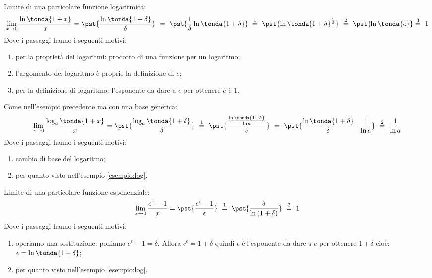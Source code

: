 \begin{esempio}
\label{esempio:log}
Limite di una particolare funzione logaritmica:
\[
 \lim_{x \rightarrow 0} \dfrac{\ln\tonda{1+x}}{x} =
 \pst{\dfrac{\ln\tonda{1+\delta}}{\delta}}~ = ~  
 \pst{\frac{1}{\delta}\ln\tonda{1+\delta}} ~\stackrel{1}{=} ~
 \pst{\ln\tonda{1+\delta}^\frac{1}{\delta}}
~ \stackrel{2}{=} ~
\pst{\ln\tonda{e}} \stackrel{3}{=} ~ 1
\]
Dove i passaggi hanno i seguenti motivi:
\begin{enumerate} [nosep]
 \item per la proprietà dei logaritmi: prodotto di una funzione per 
 un logaritmo;
 \item l'argomento del logaritmo è proprio la definizione di \(e\);
 \item per la definizione di logaritmo: l'esponente da dare a \(e\) per 
ottenere \(e\) è \(1\).
\end{enumerate}
\end{esempio}

\begin{esempio}
Come nell'esempio precedente ma con una base generica:
\[
 \lim_{x \rightarrow 0} \dfrac{\log_a\tonda{1+x}}{x} =
 \pst{\dfrac{\log_a\tonda{1+\delta}}{\delta}}~\stackrel{1}{=} ~  
 \pst{\dfrac{\frac{\ln\tonda{1+\delta}}{\ln a}}{\delta}}~= ~
 \pst{\dfrac{\ln\tonda{1+\delta}}{\delta}\cdot \dfrac{1}{\ln a}}
 ~ \stackrel{2}{=} ~
 \dfrac{1}{\ln a}
\]
Dove i passaggi hanno i seguenti motivi:
\begin{enumerate} [nosep]
 \item cambio di base del logaritmo;
 \item per quanto visto nell'esempio \ref{esempio:log}.
\end{enumerate}
\end{esempio}

\begin{esempio}
Limite di una particolare funzione esponenziale:
\[
\lim_{x \rightarrow 0} \dfrac{e^x-1}{x} =
\pst{\dfrac{e^\epsilon-1}{\epsilon}}
~ \stackrel{1}{=} ~  
\pst{\dfrac{\delta}{\ln{(1 + \delta)}}}~ \stackrel{2}{=} ~ 1
\]
Dove i passaggi hanno i seguenti motivi:
\begin{enumerate} [nosep]
 \item operiamo una sostituzione: poniamo \(e^\epsilon-1=\delta\). 
Allora \(e^\epsilon = 1+\delta\) quindi \(\epsilon\) è l'esponente da dare 
a \(e\) per ottenere \(1+\delta\) cioè: 
\(\epsilon = \ln{\tonda{1+\delta}}\);
 \item per quanto visto nell'esempio \ref{esempio:log}.
\end{enumerate}
\end{esempio}

